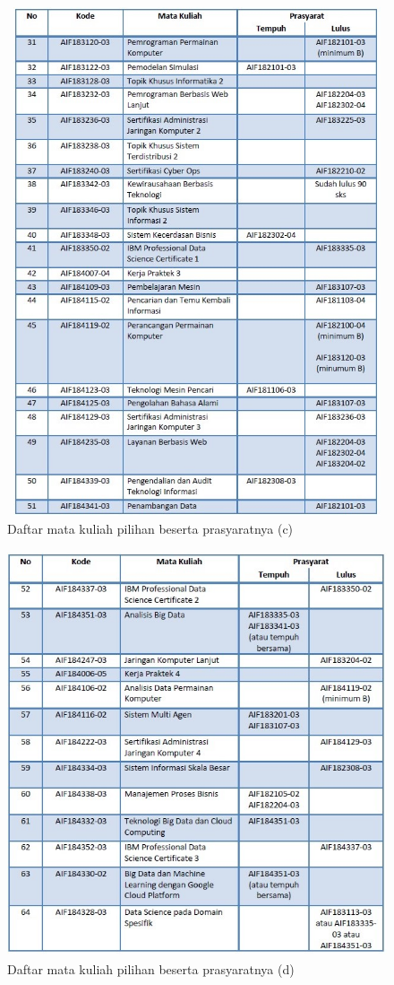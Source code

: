 \begin{figure}[H]
    \centering
    \includegraphics[width=12cm, height=15cm]{Gambar/Prasyarat MK Pilihan 3.jpg}
    \caption{Daftar mata kuliah pilihan beserta prasyaratnya (c)}
    \label{fig:gambar13}
\end{figure}

\begin{figure}[H]
    \centering
    \includegraphics[width=12cm, height=12cm]{Gambar/Prasyarat MK Pilihan 4.jpg}
    \caption{Daftar mata kuliah pilihan beserta prasyaratnya (d)}
    \label{fig:gambar14}
\end{figure}


